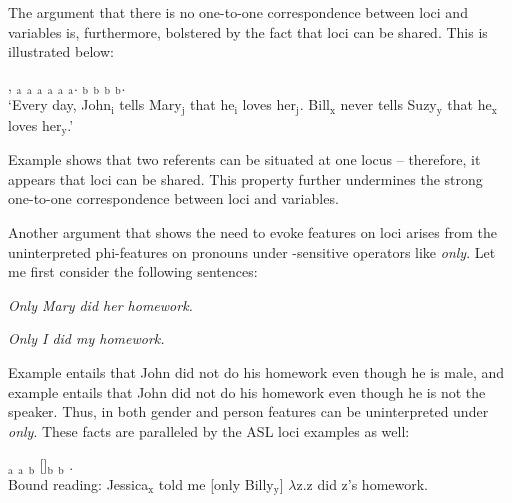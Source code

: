 \documentclass[output=paper,
modfonts
]{langscibook}
\begin{document}
The argument that there is no one-to-one correspondence between loci and variables is, furthermore, bolstered by the fact that loci can be shared. This is illustrated below: 

\begin{exe} 
	\ex \label{ex:irani:69} , $_\text{a}$ $_\text{a}$  $_\text{a}$ $_\text{a}$ $_\text{a}$  $_\text{a}$. $_\text{b}$ $_\text{b}$ $_\text{b}$  $_\text{b}$. \\
	`Every day, John$_\text{i}$ tells Mary$_\text{j}$ that he$_\text{i}$ loves her$_\text{j}$. Bill$_\text{x}$ never tells Suzy$_\text{y}$ that he$_\text{x}$ loves her$_\text{y}$.’  
\end{exe} 

Example  shows that two referents can be situated at one locus -- therefore, it appears that loci can be shared. This property further undermines the strong one-to-one correspondence between loci and variables.  

Another argument that shows the need to evoke features on loci arises from the uninterpreted phi-features on pronouns under -sensitive operators like \textit{only}. Let me first consider the following  sentences: 

\begin{exe} 
	\ex \begin{xlist}
		\ex \label{ex:irani:70} \textit{Only Mary did her homework.}
		
		\ex \label{ex:irani:71} \textit{Only I did my homework.}
	    \end{xlist} 
\end{exe} 

Example  entails that John did not do his homework even though he is male, and example  entails that John did not do his homework even though he is not the speaker. Thus, in  both gender and person features can be uninterpreted under \textit{only}. These facts are paralleled by the ASL loci examples as well: \newpage

\begin{exe} 
	\ex {}$_\text{a}$ $_\text{a}$  $_\text{b}$ []$_\text{b}$ $_\text{b}$ .\\
	Bound reading: Jessica$_\text{x}$ told me [only Billy$_\text{y}$] \(\lambda\)z.z did z’s homework. \citep[9]{Kuhn2015}
\end{exe}
\end{document}
